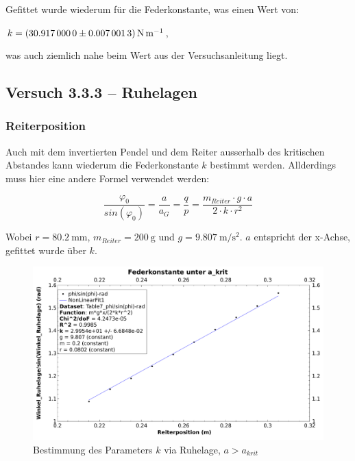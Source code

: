 Gefittet wurde  wiederum f\"ur  die Federkonstante,  was einen  Wert von:

$k = \SI[separate-uncertainty  =  true]{30.917 \pm  0.0070013}{\newton\per\meter}$,

was auch ziemlich nahe beim Wert aus der Versuchsanleitung liegt.

\clearpage
\subsection{Versuch 3.3.3 -- Ruhelagen}
\label{subsec:ruhelagen}


\subsubsection{Reiterposition}
\label{subsubsec:reiterpos}


Auch  mit dem  invertierten Pendel  und dem  Reiter ausserhalb  des kritischen
Abstandes kann  wiederum die  Federkonstante $k$  bestimmt werden. Allderdings
muss hier eine andere Formel verwendet werden:

\begin{equation}
    \frac{\varphi_0}{sin(\varphi_0)} = \frac{a}{a_G} = \frac{q}{p} = \frac{m_{Reiter} \cdot g \cdot a}{2 \cdot k \cdot r^2}
\end{equation}

Wobei $r =  \SI{80.2}{\milli\meter}$, $m_{Reiter} = \SI{200}{\gram}$  und $g =
\SI{9.807}{\meter\per\second\squared}$. $a$  entspricht der  x-Achse, gefittet
wurde \"uber $k$.

\begin{figure}[h!]
    \centering
    \includegraphics[width=\textwidth]{images/333a.pdf}
    \caption{%
        Bestimmung des Parameters $k$ via Ruhelage, $a>a_{krit}$
    }
    \label{fig:333a}
\end{figure}

